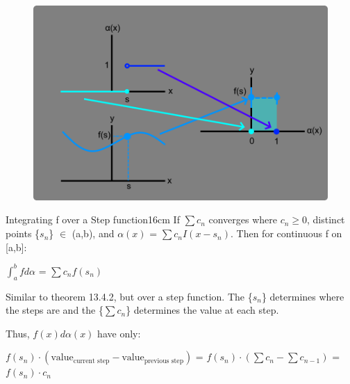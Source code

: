     \begin{figure}[h]
        \centering
        \includegraphics[scale=0.3]{Images/13.4.2.png}
    \end{figure}

    \newpage



    \begin{wtheorem}{Integrating f over a Step function}{16cm}
        If $\sum c_n$ converges where $c_n \geq 0$,
        distinct points \{$s_n$\} $\in$ (a,b), and
        $\alpha(x)$ = $\sum c_n I(x-s_n)$. Then for continuous f on [a,b]:

        \hspace{0.5cm}
        $\int_a^b f d\alpha$ = $\sum c_n f(s_n)$
    \end{wtheorem}

    \begin{intuition}
        Similar to {\color{red} theorem 13.4.2}, but over a step function.
        The \{$s_n$\} determines where the steps are and the \{$\sum c_n$\}
        determines the value at each step.

        Thus, $f(x) d\alpha(x)$ have only:

        \hspace{0.5cm}
        $f(s_n) \cdot (\text{value}_{\text{current step}}
                        - \text{value}_{\text{previous step}})$
        = $f(s_n) \cdot (\sum c_n - \sum c_{n-1})$
        = $f(s_n) \cdot c_n$
    \end{intuition}

    \vspace{0.1cm}
    
